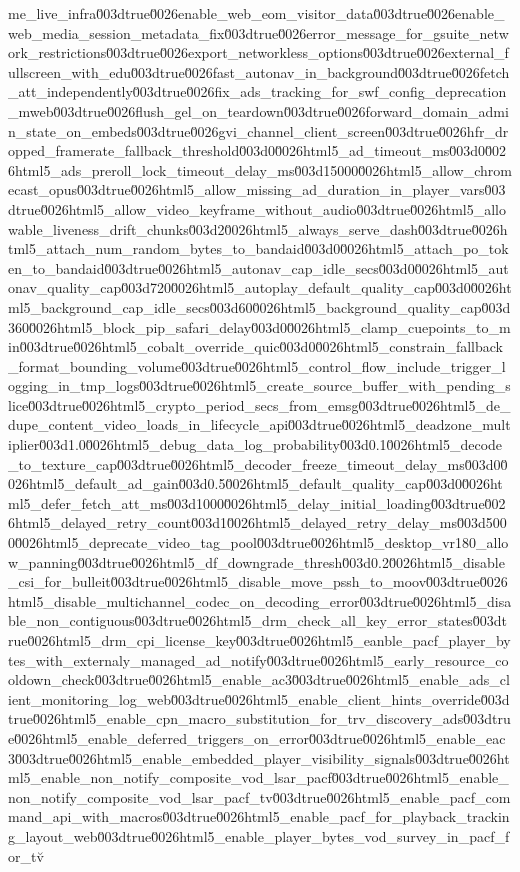 {me_live_infra\u003dtrue\u0026enable_web_eom_visitor_data\u003dtrue\u0026enable_web_media_session_metadata_fix\u003dtrue\u0026error_message_for_gsuite_network_restrictions\u003dtrue\u0026export_networkless_options\u003dtrue\u0026external_fullscreen_with_edu\u003dtrue\u0026fast_autonav_in_background\u003dtrue\u0026fetch_att_independently\u003dtrue\u0026fix_ads_tracking_for_swf_config_deprecation_mweb\u003dtrue\u0026flush_gel_on_teardown\u003dtrue\u0026forward_domain_admin_state_on_embeds\u003dtrue\u0026gvi_channel_client_screen\u003dtrue\u0026hfr_dropped_framerate_fallback_threshold\u003d0\u0026html5_ad_timeout_ms\u003d0\u0026html5_ads_preroll_lock_timeout_delay_ms\u003d15000\u0026html5_allow_chromecast_opus\u003dtrue\u0026html5_allow_missing_ad_duration_in_player_vars\u003dtrue\u0026html5_allow_video_keyframe_without_audio\u003dtrue\u0026html5_allowable_liveness_drift_chunks\u003d2\u0026html5_always_serve_dash\u003dtrue\u0026html5_attach_num_random_bytes_to_bandaid\u003d0\u0026html5_attach_po_token_to_bandaid\u003dtrue\u0026html5_autonav_cap_idle_secs\u003d0\u0026html5_autonav_quality_cap\u003d720\u0026html5_autoplay_default_quality_cap\u003d0\u0026html5_background_cap_idle_secs\u003d60\u0026html5_background_quality_cap\u003d360\u0026html5_block_pip_safari_delay\u003d0\u0026html5_clamp_cuepoints_to_min\u003dtrue\u0026html5_cobalt_override_quic\u003d0\u0026html5_constrain_fallback_format_bounding_volume\u003dtrue\u0026html5_control_flow_include_trigger_logging_in_tmp_logs\u003dtrue\u0026html5_create_source_buffer_with_pending_slice\u003dtrue\u0026html5_crypto_period_secs_from_emsg\u003dtrue\u0026html5_de_dupe_content_video_loads_in_lifecycle_api\u003dtrue\u0026html5_deadzone_multiplier\u003d1.0\u0026html5_debug_data_log_probability\u003d0.1\u0026html5_decode_to_texture_cap\u003dtrue\u0026html5_decoder_freeze_timeout_delay_ms\u003d0\u0026html5_default_ad_gain\u003d0.5\u0026html5_default_quality_cap\u003d0\u0026html5_defer_fetch_att_ms\u003d1000\u0026html5_delay_initial_loading\u003dtrue\u0026html5_delayed_retry_count\u003d1\u0026html5_delayed_retry_delay_ms\u003d5000\u0026html5_deprecate_video_tag_pool\u003dtrue\u0026html5_desktop_vr180_allow_panning\u003dtrue\u0026html5_df_downgrade_thresh\u003d0.2\u0026html5_disable_csi_for_bulleit\u003dtrue\u0026html5_disable_move_pssh_to_moov\u003dtrue\u0026html5_disable_multichannel_codec_on_decoding_error\u003dtrue\u0026html5_disable_non_contiguous\u003dtrue\u0026html5_drm_check_all_key_error_states\u003dtrue\u0026html5_drm_cpi_license_key\u003dtrue\u0026html5_eanble_pacf_player_bytes_with_externaly_managed_ad_notify\u003dtrue\u0026html5_early_resource_cooldown_check\u003dtrue\u0026html5_enable_ac3\u003dtrue\u0026html5_enable_ads_client_monitoring_log_web\u003dtrue\u0026html5_enable_client_hints_override\u003dtrue\u0026html5_enable_cpn_macro_substitution_for_trv_discovery_ads\u003dtrue\u0026html5_enable_deferred_triggers_on_error\u003dtrue\u0026html5_enable_eac3\u003dtrue\u0026html5_enable_embedded_player_visibility_signals\u003dtrue\u0026html5_enable_non_notify_composite_vod_lsar_pacf\u003dtrue\u0026html5_enable_non_notify_composite_vod_lsar_pacf_tv\u003dtrue\u0026html5_enable_pacf_command_api_with_macros\u003dtrue\u0026html5_enable_pacf_for_playback_tracking_layout_web\u003dtrue\u0026html5_enable_player_bytes_vod_survey_in_pacf_for_tv\u}
